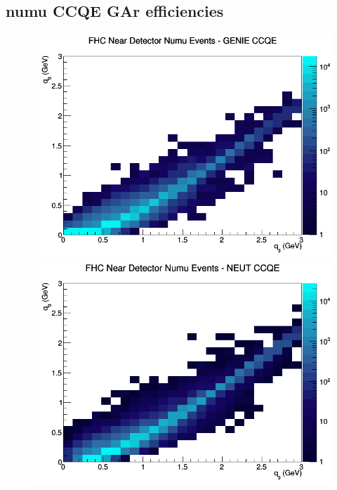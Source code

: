 \documentclass[12pt]{article}
\begin{document}
\subsection{numu CCQE GAr efficiencies}
\begin{figure}[h]
\includegraphics[width=\linewidth]{eff_q0_q3/GAr/CCQE_FHC_ND_numu_q3_q0_GENIE.png}
\endminipage
{}
\includegraphics[width=\linewidth]{eff_q0_q3/GAr/CCQE_FHC_ND_numu_q3_q0_NEUT.png}
\endminipage
{}

\end{figure}
\end{document}
